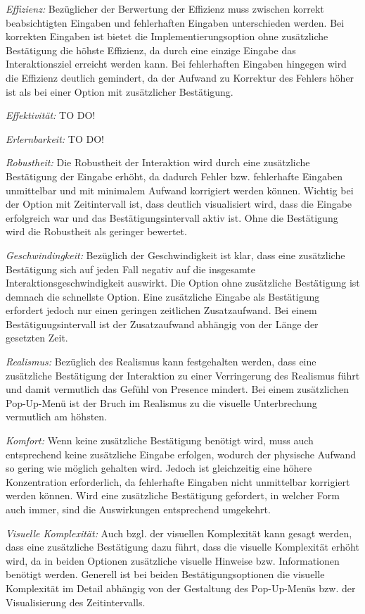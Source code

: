 \textit{Effizienz:}
Bezüglicher der Berwertung der Effizienz muss zwischen korrekt beabsichtigten Eingaben und fehlerhaften Eingaben unterschieden werden. Bei korrekten Eingaben ist bietet die Implementierungsoption ohne zusätzliche Bestätigung die höhste Effizienz, da durch eine einzige Eingabe das Interaktionsziel erreicht werden kann. Bei fehlerhaften Eingaben hingegen wird die Effizienz deutlich gemindert, da der Aufwand zu Korrektur des Fehlers höher ist als bei einer Option mit zusätzlicher Bestätigung. 

\textit{Effektivität:} TO DO!

\textit{Erlernbarkeit:} TO DO! 

\textit{Robustheit:}
Die Robustheit der Interaktion wird durch eine zusätzliche Bestätigung der Eingabe erhöht, da dadurch Fehler bzw. fehlerhafte Eingaben unmittelbar und mit minimalem Aufwand korrigiert werden können. Wichtig bei der Option mit Zeitintervall ist, dass deutlich visualisiert wird, dass die Eingabe erfolgreich war und das Bestätigungsintervall aktiv ist. Ohne die Bestätigung wird die Robustheit als geringer bewertet.  

\textit{Geschwindingkeit:}
Bezüglich der Geschwindigkeit ist klar, dass eine zusätzliche Bestätigung sich auf jeden Fall negativ auf die insgesamte Interaktionsgeschwindigkeit auswirkt. Die Option ohne zusätzliche Bestätigung ist demnach die schnellste Option. Eine zusätzliche Eingabe als Bestätigung erfordert jedoch nur einen geringen zeitlichen Zusatzaufwand. Bei einem Bestätiguugsintervall ist der Zusatzaufwand abhängig von der Länge der gesetzten Zeit. 

\textit{Realismus:}
Bezüglich des Realismus kann festgehalten werden, dass eine zusätzliche Bestätigung der Interaktion zu einer Verringerung des Realismus führt und damit vermutlich das Gefühl von Presence mindert. Bei einem zusätzlichen Pop-Up-Menü ist der Bruch im Realismus zu die visuelle Unterbrechung vermutlich am höhsten. 

\textit{Komfort:}
Wenn keine zusätzliche Bestätigung benötigt wird, muss auch entsprechend keine zusätzliche Eingabe erfolgen, wodurch der physische Aufwand so gering wie möglich gehalten wird. Jedoch ist gleichzeitig eine höhere Konzentration erforderlich, da fehlerhafte Eingaben nicht unmittelbar korrigiert werden können. Wird eine zusätzliche Bestätigung gefordert, in welcher Form auch immer, sind die Auswirkungen entsprechend umgekehrt. 
 
\textit{Visuelle Komplexität:}
Auch bzgl. der visuellen Komplexität kann gesagt werden, dass eine zusätzliche Bestätigung dazu führt, dass die visuelle Komplexität erhöht wird, da in beiden Optionen zusätzliche visuelle Hinweise bzw. Informationen benötigt werden. Generell ist bei beiden Bestätigungsoptionen die visuelle Komplexität im Detail abhängig von der Gestaltung des Pop-Up-Menüs bzw. der Visualisierung des Zeitintervalls. 


